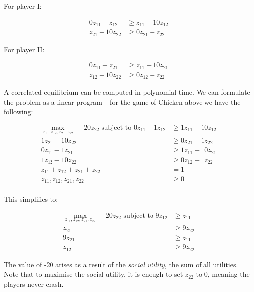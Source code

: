 For player I:

\begin{equation*}
	\begin{split}
		0 z_{11} - z_{12} & \ge z_{11} -10 z_{12} \\
		z_{21} - 10 z_{22} & \ge 0 z_{21} - z_{22}
	\end{split}
\end{equation*}

For player II:

\begin{equation*}
	\begin{split}
		0 z_{11} - z_{21} & \ge z_{11} -10 z_{21} \\
		z_{12} - 10 z_{22} & \ge 0 z_{12} - z_{22}
	\end{split}
\end{equation*}

A correlated equilibrium can be computed in polynomial time. We can formulate
the problem as a linear program -- for the game of Chicken above we have the
following:

\begin{equation*}
	\begin{split}
		\max_{z_{11}, z_{12}, z_{21}, z_{22}} -20 z_{22} \text{ subject
		to } 0 z_{11} - 1 z_{12} & \ge 1 z_{11} - 10 z_{12} \\
		1 z_{21} - 10 z_{22} & \ge 0 z_{21} - 1 z_{22} \\
		0 z_{11} - 1 z_{21} & \ge 1 z_{11} - 10 z_{21} \\
		1 z_{12} - 10 z_{22} & \ge 0 z_{12} - 1 z_{22} \\
		z_{11} + z_{12} + z_{21} + z_{22} & = 1 \\
		z_{11}, z_{12}, z_{21}, z_{22} & \ge 0 \\
	\end{split}
\end{equation*}

This simplifies to:

\begin{equation*}
	\begin{split}
		\max_{z_{11}, z_{12}, z_{21}, z_{22}} -20 z_{22} \text{ subject
		to } 9 z_{12} & \ge z_{11} \\
		z_{21} & \ge 9 z_{22} \\
		9 z_{21} & \ge z_{11} \\
		z_{12} & \ge 9 z_{22}
	\end{split}
\end{equation*}

The value of -20 arises as a result of the \emph{social utility}, the sum of
all utilities. Note that to maximise the social utility, it is enough to set
$z_{22}$ to 0, meaning the players never crash.
